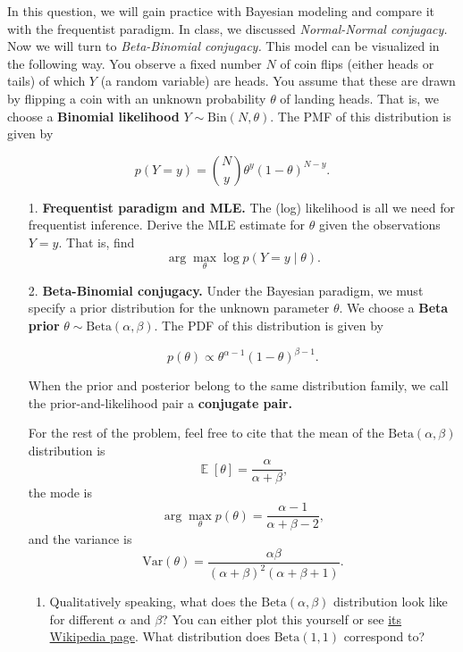 \documentclass[submit]{../harvardml}
\DeclareMathOperator*{\mean}{\mathbb{E}}
\begin{document}
\begin{problem}

In this question, we will gain practice with Bayesian modeling and
compare it with the frequentist paradigm.
In class, we discussed \emph{Normal-Normal conjugacy.} Now
we will turn to \emph{Beta-Binomial conjugacy.} This model can be
visualized in the following way.
You observe a fixed number \(N\) of coin flips (either
heads or tails) of which \(Y\) (a random variable) are heads. You assume that these are
drawn by flipping a coin with an unknown probability \(\theta\) of
landing heads. That is, we choose a \textbf{Binomial likelihood}
\(Y \sim \mathrm{Bin}(N, \theta)\). The PMF of this distribution is
given by

\[
  p(Y=y) = {N \choose y} \theta^{y} (1-\theta)^{N-y}.
\]

\begin{enumerate}
  \item[1.]
    \textbf{Frequentist paradigm and MLE.} The (log) likelihood is all we
    need for frequentist inference. Derive the MLE estimate for \(\theta\)
    given the observations \(Y = y\). That is, find
    \[\arg \max_{\theta} \log p(Y = y \mid \theta).\]

  \item[2.]
    \textbf{Beta-Binomial conjugacy.} Under the Bayesian paradigm, we must specify a
    prior distribution for the unknown parameter \(\theta\). We choose a \textbf{Beta prior}
    \(\theta \sim \mathrm{Beta}(\alpha, \beta)\). The PDF of this
    distribution is given by

    \[
      p(\theta) \propto \theta^{\alpha - 1} (1-\theta)^{\beta - 1}.
    \]

    When the prior and posterior belong to the same distribution family, we
    call the prior-and-likelihood pair a \textbf{conjugate pair.}

    For the rest of the problem, feel free to cite that the mean of the \(\mathrm{Beta}(\alpha, \beta)\) distribution is
    \[\mean[\theta] = \frac{\alpha}{\alpha+\beta},\]
    the mode is
    \[\arg\max_\theta p(\theta) = \frac{\alpha-1}{\alpha+\beta-2},\]
    and the variance is
    \[
      \mathrm{Var}(\theta) = \frac{\alpha \beta}{(\alpha + \beta)^2 (\alpha + \beta + 1)}.
    \]

    \begin{enumerate}
      \item
            Qualitatively speaking, what does the $\mathrm{Beta}(\alpha, \beta)$ distribution look like for different $\alpha$ and $\beta$? You can either plot this yourself or see \href{https://en.wikipedia.org/wiki/Beta_distribution}{its Wikipedia page}. What distribution does $\mathrm{Beta}(1, 1)$ correspond to?


\end{enumerate}
\end{enumerate}
\end{problem}
\end{document}
